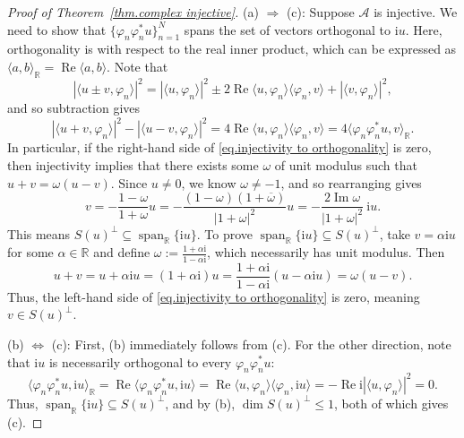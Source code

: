 \documentclass[times,10pt]{elsarticle}
\theoremstyle{plain}
\begin{document}
\begin{proof}[Proof of Theorem~\ref{thm.complex injective}]
(a) $\Rightarrow$ (c): 
Suppose $\mathcal{A}$ is injective.
We need to show that $\{\varphi_n\varphi_n^* u\}_{n=1}^N$ spans the set of vectors orthogonal to $\mathrm{i}u$.
Here, orthogonality is with respect to the real inner product, which can be expressed as $\langle a,b\rangle_\mathbb{R}=\operatorname{Re}\langle a,b\rangle$.
Note that
\begin{equation*}
|\langle u\pm v,\varphi_n\rangle|^2
=|\langle u,\varphi_n\rangle|^2\pm2\operatorname{Re}\langle u,\varphi_n\rangle\langle \varphi_n,v\rangle+|\langle v,\varphi_n\rangle|^2,
\end{equation*}
and so subtraction gives
\begin{equation}
\label{eq.injectivity to orthogonality}
|\langle u+v,\varphi_n\rangle|^2-|\langle u-v,\varphi_n\rangle|^2
=4\operatorname{Re}\langle u,\varphi_n\rangle\langle \varphi_n,v\rangle
=4\langle \varphi_n\varphi_n^*u,v\rangle_\mathbb{R}.
\end{equation}
In particular, if the right-hand side of \eqref{eq.injectivity to orthogonality} is zero, then injectivity implies that there exists some $\omega$ of unit modulus such that $u+v=\omega(u-v)$.
Since $u\neq0$, we know $\omega\neq-1$, and so rearranging gives
\begin{equation*}
v
=-\frac{1-\omega}{1+\omega}u
=-\frac{(1-\omega)(1+\overline{\omega})}{|1+\omega|^2}u
=-\frac{2\operatorname{Im}\omega}{|1+\omega|^2}~\mathrm{i}u.
\end{equation*}
This means $S(u)^\perp\subseteq\operatorname{span}_\mathbb{R}\{\mathrm{i}u\}$.
To prove $\operatorname{span}_\mathbb{R}\{\mathrm{i}u\}\subseteq S(u)^\perp$, take $v=\alpha \mathrm{i}u$ for some $\alpha\in\mathbb{R}$ and define $\omega:=\frac{1+\alpha \mathrm{i}}{1-\alpha \mathrm{i}}$, which necessarily has unit modulus.
Then
\begin{equation*}
u+v
=u+\alpha \mathrm{i} u
=(1+\alpha \mathrm{i})u
=\frac{1+\alpha \mathrm{i}}{1-\alpha \mathrm{i}}(u-\alpha \mathrm{i}u)
=\omega(u-v).
\end{equation*}
Thus, the left-hand side of \eqref{eq.injectivity to orthogonality} is zero, meaning $v\in S(u)^\perp$.

(b) $\Leftrightarrow$ (c):
First, (b) immediately follows from (c).
For the other direction, note that $\mathrm{i}u$ is necessarily orthogonal to every $\varphi_n\varphi_n^* u$:
\begin{equation*}
\langle \varphi_n\varphi_n^* u,\mathrm{i}u\rangle_\mathbb{R}
=\operatorname{Re}\langle \varphi_n\varphi_n^* u,\mathrm{i}u\rangle
=\operatorname{Re}\langle u,\varphi_n\rangle\langle \varphi_n,\mathrm{i}u\rangle
=-\operatorname{Re}\mathrm{i}|\langle u,\varphi_n\rangle|^2
=0.
\end{equation*}
Thus, $\operatorname{span}_\mathbb{R}\{\mathrm{i}u\}\subseteq S(u)^\perp$, and by (b), $\operatorname{dim}S(u)^\perp\leq1$, both of which gives (c).


\end{proof}
\end{document}
